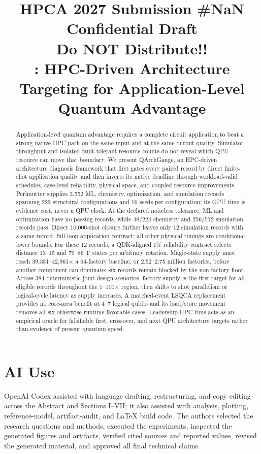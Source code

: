 \documentclass[10pt,conference]{IEEEtran}
\title{\normalsize HPCA 2027 Submission \#NaN\\
Confidential Draft\\
Do NOT Distribute!!\\[0.15in]
\LARGE \SystemName: HPC-Driven Architecture Targeting for Application-Level Quantum Advantage}
\author{}
\newcommand{\SystemName}{QArchGauge\xspace}
\begin{document}

\maketitle
\begin{abstract}
Application-level quantum advantage requires a complete circuit application to beat a strong native HPC path on the same input and at the same output quality. Simulator throughput and isolated fault-tolerant resource counts do not reveal which QPU resource can move that boundary. We present \SystemName, an HPC-driven architecture diagnosis framework that first gates every paired record by direct finite-shot application quality and then inverts its native deadline through workload-valid schedules, case-level reliability, physical space, and coupled resource improvements. Perlmutter supplies 3,552 ML, chemistry, optimization, and simulation records spanning 222 structural configurations and 16 seeds per configuration; its GPU time is evidence cost, never a QPU clock. At the declared noiseless tolerance, ML and optimization have no passing records, while 48/224 chemistry and 256/512 simulation records pass. Direct 10,000-shot closure further leaves only 12 simulation records with a same-record, full-loop application contract; all other physical timings are conditional lower bounds. For these 12 records, a QDK-aligned 1\% reliability contract selects distance 13--15 and 79--86 T states per arbitrary rotation. Magic-state supply must reach 39,351--42,961$\times$ a 64-factory baseline, or 2.52--2.75 million factories, before another component can dominate; six records remain blocked by the non-factory floor. Across 384 deterministic joint-design scenarios, factory supply is the first target for all eligible records throughout the 1--100$\times$ region, then shifts to shot parallelism or logical-cycle latency as supply increases. A matched-event LSQCA replacement provides no core-area benefit at 4--7 logical qubits and its load/store movement removes all six otherwise runtime-favorable cases. Leadership HPC thus acts as an empirical oracle for falsifiable first, crossover, and next QPU architecture targets rather than evidence of present quantum speed.
\end{abstract}
\thispagestyle{plain}












\clearpage
\section*{AI Use}
OpenAI Codex assisted with language drafting, restructuring, and copy editing
across the Abstract and Sections I--VII; it also assisted with analysis,
plotting, reference-model, artifact-audit, and LaTeX build code. The authors
selected the research questions and methods, executed the experiments,
inspected the generated figures and artifacts, verified cited sources and
reported values, revised the generated material, and approved all final
technical claims.
\end{document}
